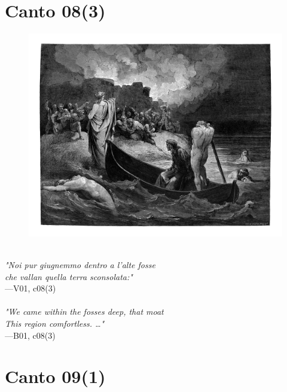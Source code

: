 \documentclass[../Dore_vision.tex]{subfiles}
\begin{document}
\section{Canto 08(3)}

\begin{figure}[ht]
\centering
\includegraphics[height=\figsize]{illustrations/book_1/V01, c08(3).jpg}
\end{figure}

\begin{center}
\begin{minipage}{0.8\linewidth}
\textit{\\
"Noi pur giugnemmo dentro a l’alte fosse\\che vallan quella terra sconsolata:"} \\
—V01, c08(3) \\~\\
\textit{"We came within the fosses deep, that moat\\This region comfortless. …"} \\
—B01, c08(3)
\end{minipage}
\end{center}

\newpage

\section{Canto 09(1)}
\end{document}
